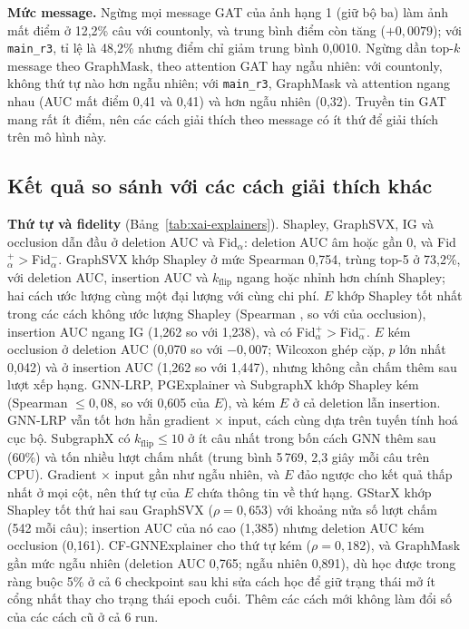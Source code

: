 \textbf{Mức message.} Ngừng mọi message GAT của ảnh hạng 1 (giữ bộ ba) làm ảnh mất điểm ở 12,2\% câu với countonly, và
trung bình điểm còn tăng ($+0{,}0079$); với \texttt{main\_r3}, tỉ lệ là 48,2\% nhưng điểm chỉ giảm trung bình 0,0010. Ngừng
dần top-$k$ message theo GraphMask, theo attention GAT hay ngẫu nhiên: với countonly, không thứ tự nào hơn ngẫu nhiên; với
\texttt{main\_r3}, GraphMask và attention ngang nhau (AUC mất điểm 0,41 và 0,41) và hơn ngẫu nhiên (0,32). Truyền tin GAT
mang rất ít điểm, nên các cách giải thích theo message có ít thứ để giải thích trên mô hình này.

\subsection{Kết quả so sánh với các cách giải thích khác}\label{sec:xai-compare-results}
\textbf{Thứ tự và fidelity} (Bảng~\ref{tab:xai-explainers}). Shapley, GraphSVX, IG và occlusion dẫn đầu ở deletion AUC và
Fid$_{\alpha}$: deletion AUC âm hoặc gần 0, và Fid$_{\alpha}^{+}>{}$Fid$_{\alpha}^{-}$. GraphSVX khớp Shapley ở mức Spearman
0,754, trùng top-5 ở 73,2\%, với deletion AUC, insertion AUC và $k_{\text{flip}}$ ngang hoặc nhỉnh hơn chính Shapley; hai
cách ước lượng cùng một đại lượng với cùng chi phí. $E$ khớp Shapley tốt nhất trong các cách không ước lượng Shapley
(Spearman , so với  của occlusion), insertion AUC ngang IG (1,262 so với 1,238), và
có Fid$_{\alpha}^{+}>{}$Fid$_{\alpha}^{-}$. $E$ kém occlusion ở deletion AUC (0,070 so với $-0{,}007$; Wilcoxon ghép cặp,
$p$ lớn nhất 0,042) và ở insertion AUC (1,262 so với 1,447), nhưng không cần chấm thêm sau lượt xếp hạng.
GNN-LRP, PGExplainer và SubgraphX khớp Shapley kém (Spearman $\le 0{,}08$, so với 0,605 của $E$), và kém $E$ ở cả deletion lẫn
insertion. GNN-LRP vẫn tốt hơn hẳn gradient $\times$ input, cách cùng dựa trên tuyến tính hoá cục bộ. SubgraphX có
$k_{\text{flip}}\le 10$ ở ít câu nhất trong bốn cách GNN thêm sau (60\%) và tốn nhiều lượt chấm nhất (trung bình 5\,769, 2,3
giây mỗi câu trên CPU). Gradient $\times$ input gần như ngẫu nhiên, và $E$ đảo ngược cho kết quả thấp nhất ở mọi cột, nên thứ
tự của $E$ chứa thông tin về thứ hạng. GStarX khớp Shapley tốt thứ hai sau GraphSVX ($\rho=0{,}653$) với khoảng nửa số lượt
chấm (542 mỗi câu); insertion AUC của nó cao (1,385) nhưng deletion AUC kém occlusion (0,161). CF-GNNExplainer cho thứ tự kém
($\rho=0{,}182$), và GraphMask gần mức ngẫu nhiên (deletion AUC 0,765; ngẫu nhiên 0,891), dù học được trong ràng buộc 5\% ở
cả 6 checkpoint sau khi sửa cách học để giữ trạng thái mở ít cổng nhất thay cho trạng thái epoch cuối. Thêm các cách mới
không làm đổi số của các cách cũ ở cả 6 run.

